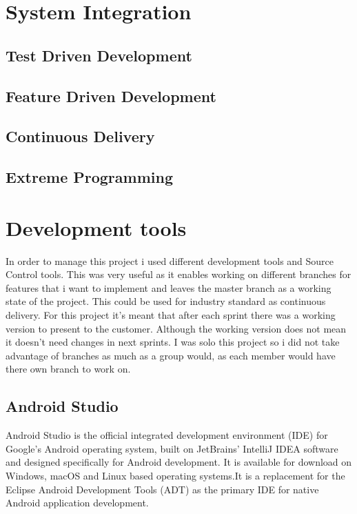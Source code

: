 \section{System Integration}

\subsection{Test Driven Development}
\subsection{Feature Driven Development}
\subsection{Continuous Delivery}
\subsection{Extreme Programming}

\section{Development tools}
In order to manage this project i used different development tools and Source Control tools. This was very useful as it enables working on different branches for features that i want to implement and leaves the master branch as a working state of the project. This could be used for industry standard as continuous delivery. For this project it's meant that after each sprint there was a working version to present to the customer. Although the working version does not mean it doesn't need changes in next sprints. I was solo this project so i did not take advantage of branches as much as a group would, as each member would have there own branch to work on.

\subsection{Android Studio}
Android Studio is the official integrated development environment (IDE) for Google's Android operating system, built on JetBrains' IntelliJ IDEA software and designed specifically for Android development. It is available for download on Windows, macOS and Linux based operating systems.It is a replacement for the Eclipse Android Development Tools (ADT) as the primary IDE for native Android application development.\newline

